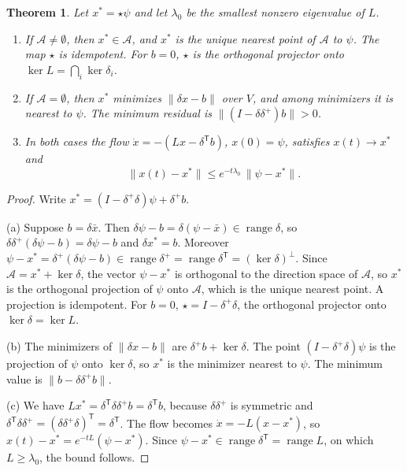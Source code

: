 \documentclass[11pt,letterpaper]{article}
\theoremstyle{plain}
\newtheorem{theorem}{Theorem}
\theoremstyle{definition}
\theoremstyle{remark}
\newcommand{\norm}[1]{\lVert #1\rVert}
\newcommand{\pinv}{^{+}}
\newcommand{\tr}{^{\mathsf T}}
\begin{document}
\begin{theorem}\label{thm:star}
Let $x^{*}=\star\psi$ and let $\lambda_0$ be the smallest nonzero eigenvalue of $L$.
\begin{enumerate}[label=(\alph*)]
\item If $\mathcal{A}\neq\emptyset$, then $x^{*}\in\mathcal{A}$, and $x^{*}$ is the unique nearest point of $\mathcal{A}$ to $\psi$. The map $\star$ is idempotent. For $b=0$, $\star$ is the orthogonal projector onto $\ker L=\bigcap_i\ker\delta_i$.
\item If $\mathcal{A}=\emptyset$, then $x^{*}$ minimizes $\norm{\delta x-b}$ over $V$, and among minimizers it is nearest to $\psi$. The minimum residual is $\norm{(I-\delta\delta\pinv)b}>0$.
\item In both cases the flow $\dot x=-(Lx-\delta\tr b)$, $x(0)=\psi$, satisfies $x(t)\to x^{*}$ and
\[
\norm{x(t)-x^{*}}\le e^{-t\lambda_0}\,\norm{\psi-x^{*}} .
\]
\end{enumerate}
\end{theorem}

\begin{proof}
Write $x^{*}=(I-\delta\pinv\delta)\psi+\delta\pinv b$.

(a) Suppose $b=\delta\bar x$. Then $\delta\psi-b=\delta(\psi-\bar x)\in\operatorname{range}\delta$, so $\delta\delta\pinv(\delta\psi-b)=\delta\psi-b$ and $\delta x^{*}=b$. Moreover $\psi-x^{*}=\delta\pinv(\delta\psi-b)\in\operatorname{range}\delta\pinv=\operatorname{range}\delta\tr=(\ker\delta)^{\perp}$. Since $\mathcal{A}=x^{*}+\ker\delta$, the vector $\psi-x^{*}$ is orthogonal to the direction space of $\mathcal{A}$, so $x^{*}$ is the orthogonal projection of $\psi$ onto $\mathcal{A}$, which is the unique nearest point. A projection is idempotent. For $b=0$, $\star=I-\delta\pinv\delta$, the orthogonal projector onto $\ker\delta=\ker L$.

(b) The minimizers of $\norm{\delta x-b}$ are $\delta\pinv b+\ker\delta$. The point $(I-\delta\pinv\delta)\psi$ is the projection of $\psi$ onto $\ker\delta$, so $x^{*}$ is the minimizer nearest to $\psi$. The minimum value is $\norm{b-\delta\delta\pinv b}$.

(c) We have $Lx^{*}=\delta\tr\delta\delta\pinv b=\delta\tr b$, because $\delta\delta\pinv$ is symmetric and $\delta\tr\delta\delta\pinv=(\delta\delta\pinv\delta)\tr=\delta\tr$. The flow becomes $\dot x=-L(x-x^{*})$, so $x(t)-x^{*}=e^{-tL}(\psi-x^{*})$. Since $\psi-x^{*}\in\operatorname{range}\delta\tr=\operatorname{range}L$, on which $L\ge\lambda_0$, the bound follows. \qedhere
\end{proof}
\end{document}
